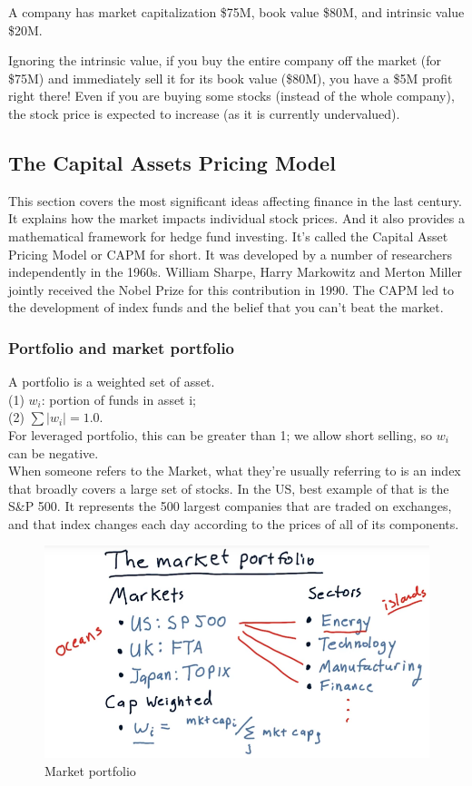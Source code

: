 \documentclass[12pt]{article}
\begin{document}
A company has market capitalization \$75M, book value \$80M, and intrinsic value \$20M.

Ignoring the intrinsic value, if you buy the entire company off the market (for \$75M) and immediately sell it for its book value (\$80M), you have a \$5M profit right there! Even if you are buying some stocks (instead of the whole company), the stock price is expected to increase (as it is currently undervalued).

\subsection{The Capital Assets Pricing Model}

This section covers the most significant ideas affecting finance in the last century. It explains how the market impacts individual stock prices. And it also provides a mathematical framework for hedge fund investing. It's called the Capital Asset Pricing Model or CAPM for short. It was developed by a number of researchers independently in the 1960s. William Sharpe, Harry Markowitz and Merton Miller jointly received the Nobel Prize for this contribution in 1990. The CAPM led to the development of index funds and the belief that you can't beat the market. 

\subsubsection{Portfolio and market portfolio}

A portfolio is a weighted set of asset. \\
(1) $w_i$: portion of funds in asset i; \\
(2) $\sum{|w_i|}=1.0$. \\
For leveraged portfolio, this can be greater than 1; we allow short selling, so $w_i$ can be negative. \\[8pt]
\noindent
When someone refers to the Market, what they're usually referring to is an index that broadly covers a large set of stocks. In the US, best example of that is the S\&P 500. It represents the 500 largest companies that are traded on exchanges, and that index changes each day according to the prices of all of its components. 

\begin{figure}[!ht]
\centering
\includegraphics[scale=0.4]{fig/fig37}
\caption{Market portfolio}
\end{figure}
\end{document}
